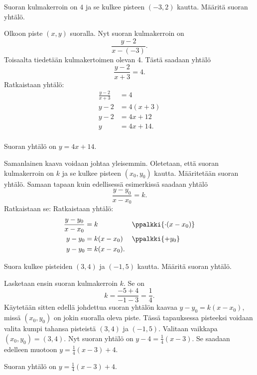 \begin{esimerkki}
Suoran kulmakerroin on $4$ ja se kulkee pisteen $(-3, 2)$ kautta. Määritä suoran yhtälö.

\begin{esimratk}
Olkoon piste $(x, y)$ suoralla. Nyt suoran kulmakerroin on 
\[
\frac{y-2}{x-(-3)}.
\]
Toisaalta tiedetään kulmakertoimen olevan 4. Tästä saadaan yhtälö
\[
\frac{y-2}{x+3}=4.
\]
Ratkaistaan yhtälö:
\begin{align*}
\frac{y-2}{x+3}&=4 \\
y-2&=4(x+3) \\
y-2&=4x+12 \\
y&=4x+14. \\
\end{align*}
\end{esimratk}

\begin{esimvast}
Suoran yhtälö on $y=4x+14$.
\end{esimvast}
\end{esimerkki}

Samanlainen kaava voidaan johtaa yleisemmin. Oletetaan, että suoran kulmakerroin on $k$ ja se kulkee pisteen $(x_0, y_0)$ kautta. Määritetään suoran yhtälö.
Samaan tapaan kuin edellisessä esimerkissä saadaan yhtälö
\[
\frac{y-y_0}{x-x_0}=k.
\]
Ratkaistaan se:
Ratkaistaan yhtälö:
\begin{align*}
\frac{y-y_0}{x-x_0}&=k && \ppalkki{\cdot (x-x_0)}\\
y-y_0&=k(x-x_0) && \ppalkki{+y_0} \\
y-y_0&=k(x-x_0). &&
\end{align*}


\begin{esimerkki}
Suora kulkee pisteiden $(3, 4)$ ja $(-1, 5)$ kautta. Määritä suoran yhtälö.

\begin{esimratk}
Lasketaan ensin suoran kulmakerroin $k$. Se on
\[
k=\frac{-5+4}{-1-3}=\frac{1}{4}.
\]
Käytetään sitten edellä johdettua suoran yhtälön kaavaa $y-y_0=k(x-x_0)$, missä $(x_0, y_0)$ on jokin suoralla oleva piste. Tässä tapauksessa pisteeksi voidaan valita kumpi tahansa pisteistä $(3, 4)$ ja $(-1, 5)$.
Valitaan vaikkapa $(x_0, y_0)=(3, 4)$. Nyt suoran yhtälö on $y-4=\frac{1}{4}(x-3)$. Se saadaan edelleen muotoon $y=\frac{1}{4}(x-3)+4$.
\end{esimratk}
\begin{esimvast}
Suoran yhtälö on $y=\frac{1}{4}(x-3)+4$.
\end{esimvast}
\end{esimerkki}

